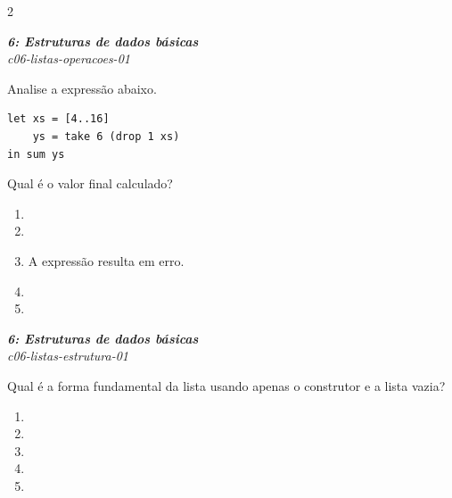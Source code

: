\documentclass[a4paper,10pt,brazil]{article}
\begin{document}
\begin{multicols}{2}
\begin{flushright}
  \footnotesize
  \textit{\textbf{6: Estruturas de dados básicas}}\\
  \textit{c06-listas-operacoes-01}\\

\end{flushright}
Analise a expressão abaixo.
\begin{verbatim}
let xs = [4..16]
    ys = take 6 (drop 1 xs)
in sum ys
\end{verbatim}
Qual é o valor final calculado?

\begin{enumerate}
  \item {}

  \item {}

  \item A expressão resulta em erro.

  \item {}

  \item {}


\end{enumerate}

\begin{flushright}
  \footnotesize
  \textit{\textbf{6: Estruturas de dados básicas}}\\
  \textit{c06-listas-estrutura-01}\\

\end{flushright}
Qual é a forma fundamental da lista \haskellinline{['a', 'b', 'c']} usando apenas o construtor \haskellinline{(:)} e a lista vazia?

\begin{enumerate}
  \item {}

  \item {}

  \item \haskellinline{['a'] : ['b'] : ['c']}

  \item {}

  \item {}



\end{enumerate}
\end{multicols}
\end{document}
